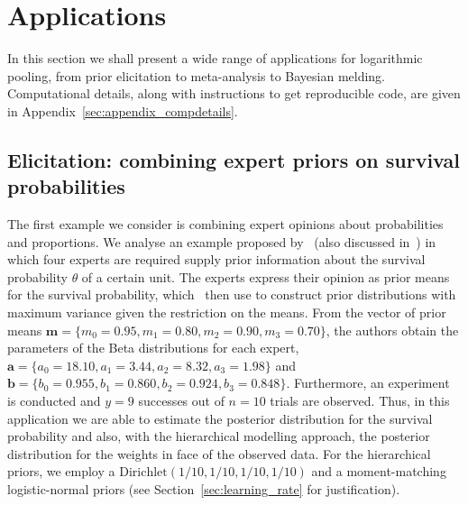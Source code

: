 \documentclass[a4paper, notitlepage, 11pt]{article}
\begin{document}
\section{Applications}
\label{sec:apps}

In this section we shall present a wide range of applications for logarithmic pooling, from prior elicitation to meta-analysis to Bayesian melding.
Computational details, along with instructions to get reproducible code, are given in  Appendix~\ref{sec:appendix_compdetails}.

\subsection{Elicitation: combining expert priors on survival probabilities}
\label{sec:survivalProbs}

The first example we consider is combining expert opinions about probabilities and proportions.
We analyse an example proposed by~\cite{Savchuk1994} (also discussed in~\cite{Rufo2012B}) in which four experts are required supply prior information about the survival probability $\theta$ of a certain unit.
The experts express their opinion as prior means for the survival probability, which~\cite{Savchuk1994} then use to construct prior distributions with maximum variance given the restriction on the means.
From the vector of prior means $\mathbf{m} = \{ m_0 = 0.95, m_1 = 0.80, m_2 = 0.90, m_3 = 0.70 \}$, the authors obtain the parameters of the Beta distributions for each expert,  $\mathbf{a} = \{ a_0 = 18.10, a_1 = 3.44 , a_2 = 8.32, a_3 = 1.98 \}$ and  $\mathbf{b} = \{ b_0 = 0.955 , b_1 = 0.860, b_2 = 0.924, b_3 = 0.848\}$.
Furthermore, an experiment is conducted and $y = 9$ successes out of $n = 10$ trials are observed.
Thus, in this application we are able to estimate the posterior distribution for the survival probability and also, with  the hierarchical modelling approach, the posterior distribution for the weights in face of the observed data.
For the hierarchical priors, we employ a $\text{Dirichlet}(1/10, 1/10, 1/10, 1/10)$ and a moment-matching logistic-normal priors (see Section~\ref{sec:learning_rate} for justification).
\end{document}
